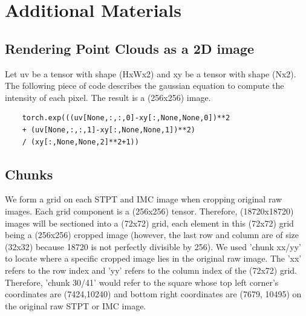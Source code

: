 \documentclass[10pt,twocolumn,letterpaper]{article}
\begin{document}
\pagebreak

\section{Additional Materials}
\subsection{Rendering Point Clouds as a 2D image}
Let uv be a tensor with shape (HxWx2) and xy be a tensor with shape (Nx2). The following piece of code describes the gaussian equation to compute the intensity of each pixel. The result is a (256x256) image.

\begin{verbatim}
	torch.exp(((uv[None,:,:,0]-xy[:,None,None,0])**2
	+ (uv[None,:,:,1]-xy[:,None,None,1])**2)
	/ (xy[:,None,None,2]**2+1))
\end{verbatim}

\subsection{Chunks}
We form a grid on each STPT and IMC image when cropping original raw images. Each grid component is a (256x256) tensor. Therefore, (18720x18720) images will be sectioned into a (72x72) grid, each element in this (72x72) grid being a (256x256) cropped image (however, the last row and column are of size (32x32) because 18720 is not perfectly divisible by 256). We used 'chunk xx/yy' to locate where a specific cropped image lies in the original raw image. The 'xx' refers to the row index and 'yy' refers to the column index of the (72x72) grid. Therefore, 'chunk 30/41' would refer to the square whose top left corner's coordinates are (7424,10240) and bottom right coordinates are (7679, 10495) on the original raw STPT or IMC image.



{\small


}
\end{document}
